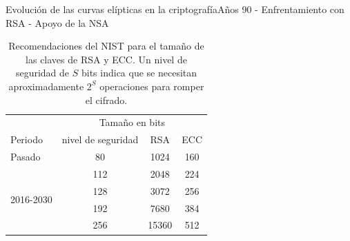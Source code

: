 \documentclass[spanish]{beamer}
\begin{document}
\begin{frame}[fragile]{Evolución de las curvas elípticas en la criptografía}{Años 90 - Enfrentamiento con RSA - Apoyo de la NSA}
\begin{table}[h]
  \centering
  \sffamily
  \begin{tabular}{lccc}
    \toprule
     & \multicolumn{3}{c}{Tamaño en bits} \\
    Periodo & nivel de seguridad & RSA & ECC \\
    \midrule
    Pasado & 80 & 1024 & 160\\
    \multirow[t]{4}{*}{2016-2030} & 112 & 2048 & 224\\
     & 128 & 3072 & 256\\
     & 192 & 7680 & 384\\
     & 256 & 15360 & 512\\
    \bottomrule
  \end{tabular}
  \caption{Recomendaciones del NIST para el tamaño de las claves de RSA y ECC. Un nivel de seguridad de \(S\) bits indica que se necesitan aproximadamente \(2^S\) operaciones para romper el cifrado.}
  \label{tab:rsa-ecc-nist}
\end{table} %
\end{frame}


\begin{frame}
  \printbibliography
\end{frame}
\end{document}
